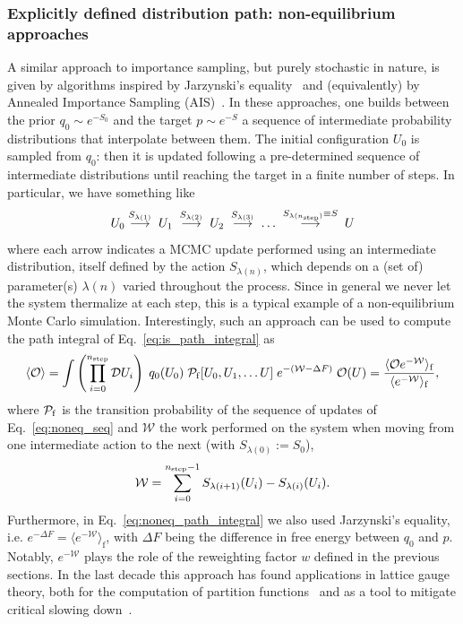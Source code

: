 \documentclass[12pt]{article}
\begin{document}
\subsubsection{Explicitly defined distribution path: non-equilibrium approaches}

A similar approach to importance sampling, but purely stochastic in nature, is given by algorithms inspired by Jarzynski's equality~\cite{Jarzynski1997,Jarzynski1997_2} and (equivalently) by Annealed Importance Sampling (AIS)~\cite{Neal2001}. 
In these approaches, one builds between the prior $q_0 \sim e^{-S_0}$ and the target $p \sim e^{-S}$ a sequence of intermediate probability distributions that interpolate between them. The initial configuration $U_0$ is sampled from $q_0$: then it is updated following a pre-determined sequence of intermediate distributions until reaching the target in a finite number of steps. In particular, we have something like
\begin{equation}
\label{eq:noneq_seq}
  U_0 \stackrel{S_{\lambda(1)}}{\longrightarrow} \; U_1 \;
  \stackrel{S_{\lambda(2)}}{\longrightarrow} \; U_2 \;
  \stackrel{S_{\lambda(3)}}{\longrightarrow} \; \dots \;
  \stackrel{S_{\lambda(n_{\rm step})} \equiv S}{\longrightarrow} \;  U
\end{equation}
where each arrow indicates a MCMC update performed using an intermediate distribution, itself defined by the action $S_{\lambda(n)}$, which depends on a (set of) parameter(s) $\lambda(n)$ varied throughout the process.
Since in general we never let the system thermalize at each step, this is a typical example of a non-equilibrium Monte Carlo simulation. Interestingly, such an approach can be used to compute the path integral of Eq.~\eqref{eq:is_path_integral} as
\begin{equation}
\label{eq:noneq_path_integral}
    \langle \mathcal{O} \rangle = \int \left( \prod_{i=0}^{n_{\rm step}} \mathcal{D} U_i \right) \; q_0(U_0) \; \mathcal{P}_{\rm f}[U_0, U_1, \dots U] \; e^{-(\mathcal{W} - \Delta F)} \; \mathcal{O}(U) = \frac{\langle \mathcal{O} e^{-\mathcal{W}} \rangle_{\mathrm f}}{\langle e^{-\mathcal{W}} \rangle_{\mathrm f}},
\end{equation}
where $\mathcal{P}_{\rm f}$ is the transition probability of the sequence of updates of Eq.~\eqref{eq:noneq_seq} and $\mathcal{W}$ the work performed on the system when moving from one intermediate action to the next (with $S_{\lambda(0)} := S_0$),
\begin{equation}
\label{eq:work}
    \mathcal{W} = \sum_{i=0}^{n_{\rm step}-1} S_{\lambda(i+1)} (U_i) - S_{\lambda(i)} (U_i).
\end{equation}
Furthermore, in Eq.~\eqref{eq:noneq_path_integral} we also used Jarzynski's equality, i.e. $e^{-\Delta F} =\langle e^{-\mathcal{W}} \rangle_{\mathrm f}$, with $\Delta F$ being the difference in free energy between $q_0$ and $p$. Notably, $e^{-\mathcal{W}}$ plays the role of the reweighting factor $w$ defined in the previous sections. In the last decade this approach has found applications in lattice gauge theory, both for the computation of partition functions~\cite{Caselle:2016wsw,Caselle:2018kap} and as a tool to mitigate critical slowing down~\cite{Bonanno:2024udh}.
\end{document}

